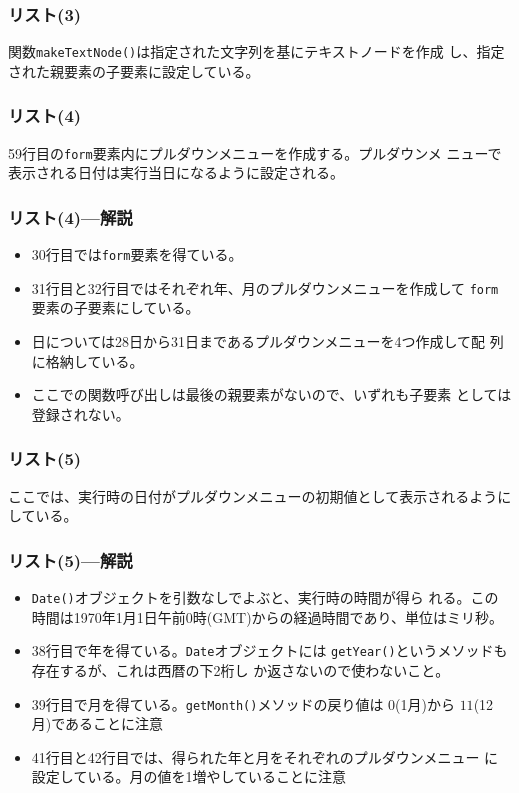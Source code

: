 \begin{frame}[containsverbatim]
\frametitle{リスト(3)}
関数\texttt{makeTextNode()}は指定された文字列を基にテキストノードを作成
 し、指定された親要素の子要素に設定している。
\end{frame}
\begin{frame}[containsverbatim]
\frametitle{リスト(4)}
59行目の\texttt{form}要素内にプルダウンメニューを作成する。プルダウンメ
 ニューで表示される日付は実行当日になるように設定される。
\end{frame}
\begin{frame}[containsverbatim]
\frametitle{リスト(4)---解説}
\begin{itemize}
 \item 30行目では\texttt{form}要素を得ている。
 \item 31行目と32行目ではそれぞれ年、月のプルダウンメニューを作成して
       \texttt{form}要素の子要素にしている。
 \item 日については28日から31日まであるプルダウンメニューを4つ作成して配
       列に格納している。
 \item ここでの関数呼び出しは最後の親要素がないので、いずれも子要素
       としては登録されない。
\end{itemize}
\end{frame}
\begin{frame}[containsverbatim]
\frametitle{リスト(5)}
ここでは、実行時の日付がプルダウンメニューの初期値として表示されるように
 している。
\end{frame}
\begin{frame}[containsverbatim]
\frametitle{リスト(5)---解説}
\begin{itemize}
 \item \texttt{Date()}オブジェクトを引数なしでよぶと、実行時の時間が得ら
       れる。この時間は1970年1月1日午前0時(GMT)からの経過時間であり、単位はミリ秒。
 \item 38行目で年を得ている。\texttt{Date}オブジェクトには
       \texttt{getYear()}というメソッドも存在するが、これは西暦の下2桁し
       か返さないので使わないこと。
 \item 39行目で月を得ている。\texttt{getMonth()}メソッドの戻り値は
       $0$(1月)から $11$(12月)であることに注意
 \item 41行目と42行目では、得られた年と月をそれぞれのプルダウンメニュー
       に設定している。月の値を1増やしていることに注意
\end{itemize}
\end{frame}
